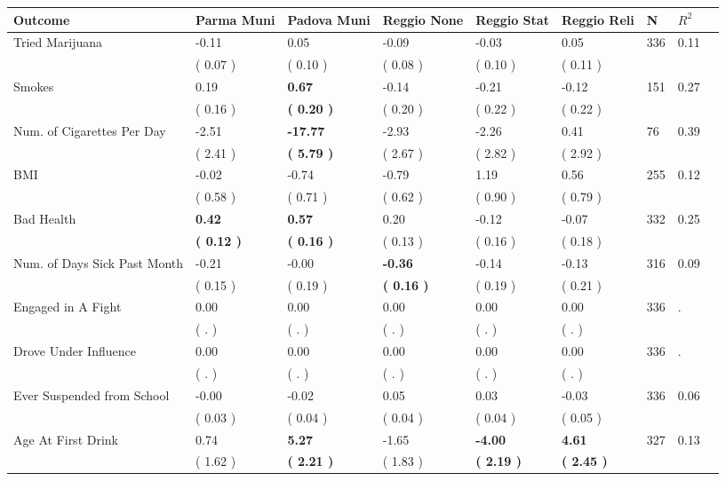 \begin{tabular}{L{6.2cm} C{1.8cm} C{1.8cm} C{1.8cm} C{1.8cm} C{1.8cm} C{1.8cm} C{0.3cm} C{0.3cm}}
\toprule
 \textbf{Outcome} & \textbf{Parma Muni} & \textbf{Padova Muni} & \textbf{Reggio None} & \textbf{Reggio Stat} & \textbf{Reggio Reli} & \textbf{N} & \textbf{$ R^2$} \\
\midrule
Tried Marijuana &     -0.11 &      0.05 &     -0.09 &     -0.03 &      0.05  & 336 &       0.11 \\ 
 & (     0.07 ) & (     0.10 ) & (     0.08 ) & (     0.10 ) & (     0.11 )  & \\
Smokes &      0.19 & \textbf{     0.67} &     -0.14 &     -0.21 &     -0.12  & 151 &       0.27 \\ 
 & (     0.16 ) & \textbf{(     0.20 )} & (     0.20 ) & (     0.22 ) & (     0.22 )  & \\
Num. of Cigarettes Per Day &     -2.51 & \textbf{   -17.77} &     -2.93 &     -2.26 &      0.41  & 76 &       0.39 \\ 
 & (     2.41 ) & \textbf{(     5.79 )} & (     2.67 ) & (     2.82 ) & (     2.92 )  & \\
BMI &     -0.02 &     -0.74 &     -0.79 &      1.19 &      0.56  & 255 &       0.12 \\ 
 & (     0.58 ) & (     0.71 ) & (     0.62 ) & (     0.90 ) & (     0.79 )  & \\
Bad Health & \textbf{     0.42} & \textbf{     0.57} &      0.20 &     -0.12 &     -0.07  & 332 &       0.25 \\ 
 & \textbf{(     0.12 )} & \textbf{(     0.16 )} & (     0.13 ) & (     0.16 ) & (     0.18 )  & \\
Num. of Days Sick Past Month &     -0.21 &     -0.00 & \textbf{    -0.36} &     -0.14 &     -0.13  & 316 &       0.09 \\ 
 & (     0.15 ) & (     0.19 ) & \textbf{(     0.16 )} & (     0.19 ) & (     0.21 )  & \\
Engaged in A Fight &      0.00 &      0.00 &      0.00 &      0.00 &      0.00  & 336 &          . \\ 
 & (        . ) & (        . ) & (        . ) & (        . ) & (        . )  & \\
Drove Under Influence &      0.00 &      0.00 &      0.00 &      0.00 &      0.00  & 336 &          . \\ 
 & (        . ) & (        . ) & (        . ) & (        . ) & (        . )  & \\
Ever Suspended from School &     -0.00 &     -0.02 &      0.05 &      0.03 &     -0.03  & 336 &       0.06 \\ 
 & (     0.03 ) & (     0.04 ) & (     0.04 ) & (     0.04 ) & (     0.05 )  & \\
Age At First Drink &      0.74 & \textbf{     5.27} &     -1.65 & \textbf{    -4.00} & \textbf{     4.61}  & 327 &       0.13 \\ 
 & (     1.62 ) & \textbf{(     2.21 )} & (     1.83 ) & \textbf{(     2.19 )} & \textbf{(     2.45 )}  & \\
\bottomrule
\end{tabular}
